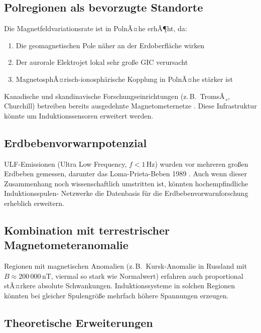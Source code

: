 ﻿\documentclass[a4paper,12pt]{article}
\theoremstyle{definition}
\begin{document}
\subsection{Polregionen als bevorzugte Standorte}

Die Magnetfeldvariationsrate ist in PolnÃ¤he erhÃ¶ht, da:
\begin{enumerate}
    \item Die geomagnetischen Pole n\"aher an der Erdoberfl\"ache wirken
    \item Der aurorale Elektrojet lokal sehr gro{\ss}e GIC verursacht
    \item MagnetosphÃ¤risch-ionosph\"arische Kopplung in PolnÃ¤he st\"arker ist
\end{enumerate}
Kanadische und skandinavische Forschungseinrichtungen (z.\,B.\ TromsÃ¸,
Churchill) betreiben bereits ausgedehnte Magnetometernetze \cite{mann2008image}.
Diese Infrastruktur k\"onnte um Induktionssensoren erweitert werden.

\subsection{Erdbebenvorwarnpotenzial}

ULF-Emissionen (Ultra Low Frequency, $f < 1\,\mathrm{Hz}$) wurden
vor mehreren gro{\ss}en Erdbeben gemessen, darunter das Loma-Prieta-Beben
1989 \cite{fraser1990anomalous}. Auch wenn dieser Zusammenhang noch
wissenschaftlich umstritten ist, k\"onnten hochempfindliche Induktionsspulen-
Netzwerke die Datenbasis f\"ur die Erdbebenvorwarnforschung erheblich
erweitern.

\subsection{Kombination mit terrestrischer Magnetometeranomalie}

Regionen mit magnetischen Anomalien (z.\,B.\ Kursk-Anomalie in Russland mit
$B \approx 200\,000\,\mathrm{nT}$, viermal so stark wie Normalwert)
erfahren auch proportional stÃ¤rkere absolute Schwankungen. Induktionssysteme
in solchen Regionen k\"onnten bei gleicher Spulengr\"o{\ss}e mehrfach h\"ohere
Spannungen erzeugen.

\subsection{Theoretische Erweiterungen}
\end{document}

